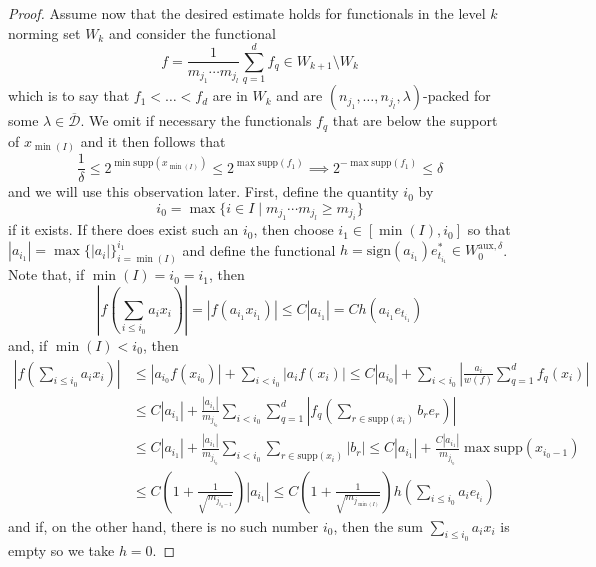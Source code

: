 \documentclass[12pt,a4paper]{amsart}
\newcommand{\bes}{\begin{equation*}}
\newcommand{\ees}{\end{equation*}}
\newcommand{\supp}{\text{supp}}
\theoremstyle{definition}
\theoremstyle{plain}
\begin{document}
\begin{proof}
Assume now that the desired estimate holds for functionals in the level $k$ norming set $W_{k}$ and consider the functional
\bes f=\frac{1}{m_{j_{1}}\cdots m_{j_{l}}}\sum_{q=1}^{d}f_{q}\in W_{k+1}\setminus W_{k} \ees
which is to say that $f_{1}<\ldots<f_{d}$ are in $W_{k}$ and are $(n_{j_{1}},\ldots,n_{j_{l}},\lambda)$-packed for some $\lambda\in\overline{\mathcal{D}}$. We omit if necessary the functionals $f_{q}$ that are below the support of $x_{\min(I)}$ and it then follows that 
\bes \frac{1}{\delta}\leq 2^{\min\supp(x_{\min(I)})}\leq 2^{\max\supp(f_{1})} \implies 2^{-\max\supp(f_{1})}\leq\delta \ees
and we will use this observation later. First, define the quantity $i_{0}$ by
\bes i_{0}=\max\{i\in I \mid m_{j_{1}}\cdots m_{j_{l}}\geq m_{j_{i}}\} \ees
if it exists. If there does exist such an $i_{0}$, then choose $i_{1}\in[\min(I),i_{0}]$ so that $|a_{i_{1}}|=\max\{|a_{i}|\}_{i=\min(I)}^{i_{1}}$ and define the functional $h=\text{sign}(a_{i_{1}})e^{*}_{t_{i_{1}}}\in W^{\text{aux},\delta}_{0}$. Note that, if $\min(I)=i_{0}=i_{1}$, then
\bes \left\vert f\left(\sum_{i\leq i_{0}}a_{i}x_{i}\right)\right\vert=|f(a_{i_{1}}x_{i_{1}})|\leq C|a_{i_{1}}|=Ch(a_{i_{1}}e_{t_{i_{1}}}) \ees
and, if $\min(I)<i_{0}$, then
\begin{align*} \left\vert f\left(\sum_{i\leq i_{0}}a_{i}x_{i}\right)\right\vert &\leq |a_{i_{0}}f(x_{i_{0}})|+\sum_{i<i_{0}}|a_{i}f(x_{i})| \leq C|a_{i_{0}}|+\sum_{i<i_{0}}\left\vert\frac{a_{i}}{w(f)}\sum_{q=1}^{d}f_{q}(x_{i})\right\vert \\ &\leq C|a_{i_{1}}|+\frac{|a_{i_{1}}|}{m_{j_{i_{0}}}}\sum_{i<i_{0}}\sum_{q=1}^{d}\left\vert f_{q}\left(\sum_{r\in\supp(x_{i})}b_{r}e_{r}\right)\right\vert \\ &\leq C|a_{i_{1}}|+\frac{|a_{i_{1}}|}{m_{j_{i_{0}}}}\sum_{i<i_{0}}\sum_{r\in\supp(x_{i})}|b_{r}| \leq C|a_{i_{1}}|+\frac{C|a_{i_{1}}|}{m_{j_{i_{0}}}}\max\supp(x_{i_{0}-1}) \\ &\leq C\left(1+\frac{1}{\sqrt{m_{j_{i_{0}-1}}}}\right)|a_{i_{1}}| \leq C\left(1+\frac{1}{\sqrt{m_{j_{\min(I)}}}}\right)h\left(\sum_{i\leq i_{0}}a_{i}e_{t_{i}}\right)\end{align*}
and if, on the other hand, there is no such number $i_{0}$, then the sum $\sum_{i\leq i_{0}}a_{i}x_{i}$ is empty so we take $h=0$.


\end{proof}
\end{document}
